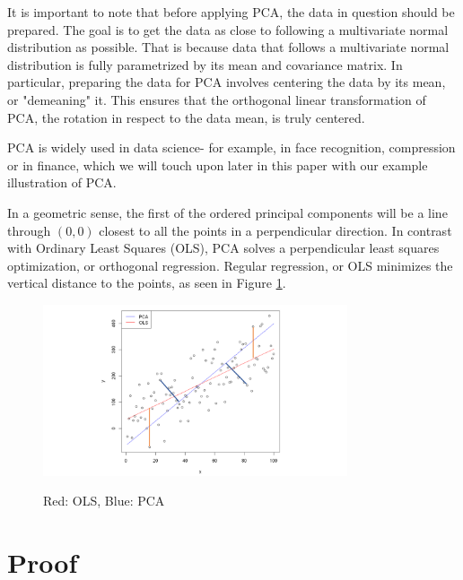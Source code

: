 \documentclass{article}
\begin{document}
It is important to note that before applying PCA, the data in question should be prepared. The goal is to get the data as close to following a multivariate normal distribution as possible. That is because data that follows a multivariate normal distribution is fully parametrized by its mean and covariance matrix. In particular, preparing the data for PCA involves centering the data by its mean, or "demeaning" it. This ensures that the orthogonal linear transformation of PCA, the rotation in respect to the data mean, is truly centered.

PCA is widely used in data science- for example, in face recognition, compression or in finance, which we will touch upon later in this paper with our example illustration of PCA.

In a geometric sense, the first of the ordered principal components will be a line through $(0,0)$ closest to all the points in a perpendicular direction. In contrast with Ordinary Least Squares (OLS), PCA solves a perpendicular least squares optimization, or orthogonal regression. Regular regression, or OLS minimizes the vertical distance to the points, as seen in Figure \ref{pca_vs_regression}.


\begin{figure}[!hpt]
    \caption{Red: OLS, Blue: PCA}
    \centering
    \includegraphics[width=0.8\textwidth]{pcavsols.png}
    \label{pca_vs_regression}
\end{figure}


\section{Proof}
\end{document}
